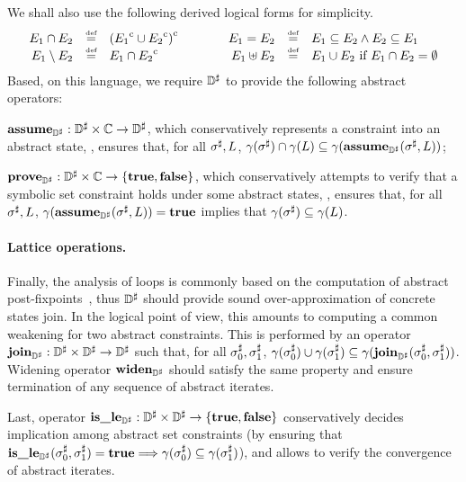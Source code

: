 We shall also use the following derived logical forms for simplicity.
\[
\begin{array}{rclcrcl}
  E_1 \cap E_2 & \stackrel{\textrm{\tiny def}}{=} & {({E_1}^{\mathrm{c}} \cup {E_2}^{\mathrm{c}})}^{\mathrm{c}}
  & \qquad &
  E_1 = E_2 & \stackrel{\textrm{\tiny def}}{=} & E_1 \subseteq E_2 \wedge E_2 \subseteq E_1
  \\
  E_1 \setminus E_2 &  \stackrel{\textrm{\tiny def}}{=} & E_1 \cap {E_2}^{\mathrm{c}}
  & \qquad &
  E_1 \uplus E_2 & \stackrel{\textrm{\tiny def}}{=} & E_1 \cup E_2 \textrm{ if } E_1 \cap E_2 = \emptyset
  \\
\end{array}
\]
Based, on this language, we require \( {\mathbb{D}}^{\sharp} \) to provide the following
abstract operators:
\begin{compactitem}
\item \( \textbf{assume}_{{\mathbb{D}}^{\sharp}}: {\mathbb{D}}^{\sharp} \times \mathbb{C} \rightarrow {\mathbb{D}}^{\sharp} \), which
  conservatively represents a constraint into an abstract state, \ie,
  ensures that, for all \( {\sigma}^{\sharp}, L \), \( \gamma( {\sigma}^{\sharp} ) \cap
  \gamma( L ) \subseteq \gamma( \textbf{assume}_{{\mathbb{D}}^{\sharp}}( {\sigma}^{\sharp}, L ) ) \);
\item \( \textbf{prove}_{{\mathbb{D}}^{\sharp}}: {\mathbb{D}}^{\sharp} \times \mathbb{C} \rightarrow \{ \mathbf{true}, \mathbf{false} \} \),
  which conservatively attempts to verify that a symbolic set constraint
  holds under some abstract states, \ie, ensures that, for all \( {\sigma}^{\sharp},
  L \), \( \gamma( \textbf{assume}_{{\mathbb{D}}^{\sharp}}( {\sigma}^{\sharp}, L ) ) = \mathbf{true} \) implies that
  \( \gamma( {\sigma}^{\sharp} ) \subseteq \gamma( L ) \).
\end{compactitem}

\paragraph{Lattice operations.}
Finally, the analysis of loops is commonly based on the computation of
abstract post-fixpoints~\cite{cc:popl:77}, thus \( {\mathbb{D}}^{\sharp} \) should provide
sound over-approximation of concrete states join.
In the logical point of view, this amounts to computing a common weakening
for two abstract constraints.
This is performed by an operator \( \textbf{join}_{{\mathbb{D}}^{\sharp}}: {\mathbb{D}}^{\sharp} \times {\mathbb{D}}^{\sharp}
\rightarrow {\mathbb{D}}^{\sharp} \) such that, for all \( {\sigma}^{\sharp}_0, {\sigma}^{\sharp}_1 \),
\( \gamma( {\sigma}^{\sharp}_0 ) \cup \gamma( {\sigma}^{\sharp}_1 ) \subseteq
\gamma( \textbf{join}_{{\mathbb{D}}^{\sharp}}( {\sigma}^{\sharp}_0, {\sigma}^{\sharp}_1 ) ) \).
Widening operator \( \textbf{widen}_{{\mathbb{D}}^{\sharp}} \) should satisfy the same property
and ensure termination of any sequence of abstract iterates.

Last, operator \( \textbf{is\_le}_{{\mathbb{D}}^{\sharp}}: {\mathbb{D}}^{\sharp} \times {\mathbb{D}}^{\sharp} \rightarrow \{ \mathbf{true},
\mathbf{false} \} \) conservatively decides implication among abstract set
constraints (by ensuring that \( \textbf{is\_le}_{{\mathbb{D}}^{\sharp}}( {\sigma}^{\sharp}_0, {\sigma}^{\sharp}_1 ) =
\mathbf{true} \Longrightarrow \gamma( {\sigma}^{\sharp}_0 ) \subseteq \gamma(
{\sigma}^{\sharp}_1 ) \)), and allows to verify the convergence of abstract
iterates.